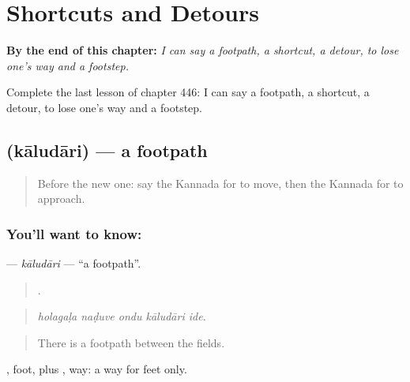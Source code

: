 
\chapter{Shortcuts and Detours}
\label{ch:ka-shortcuts-and-detours}

\begin{chapteropening}
\textbf{By the end of this chapter:} \emph{I can say a footpath, a shortcut, a detour, to lose one's way and a footstep.}

Complete the last lesson of chapter 446: I can say a footpath, a shortcut, a detour, to lose one's way and a footstep.
\end{chapteropening}

\section[\texorpdfstring{\kn{ಕಾಲುದಾರಿ} (kāludāri)}{ಕಾಲುದಾರಿ (kāludāri)}]{ (kāludāri) — a footpath}

\label{lesson:KA-C446-kaludari}



\begin{quote}
Before the new one: say the Kannada for to move, then the Kannada for to approach.
\end{quote}

\subsection*{You'll want to know: }
\textbf{} — \emph{kāludāri} — \textquotedblleft{}a footpath\textquotedblright{}.

\begin{quote}
    .
\end{quote}

\begin{quote}
\emph{holagaḷa naḍuve ondu kāludāri ide.}
\end{quote}

\begin{quote}
There is a footpath between the fields.
\end{quote}

, foot, plus , way: a way for feet only.

